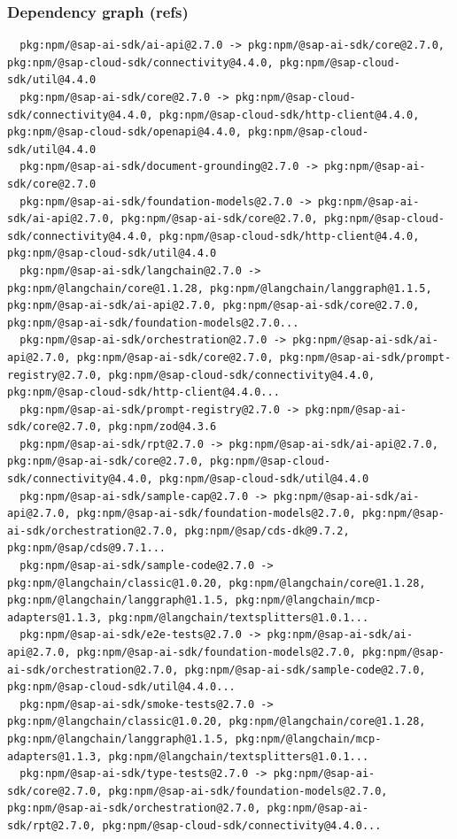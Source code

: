 \documentclass[11pt]{article}
\begin{document}
\subsubsection*{Dependency graph (refs)}
\begin{verbatim}
  pkg:npm/@sap-ai-sdk/ai-api@2.7.0 -> pkg:npm/@sap-ai-sdk/core@2.7.0, pkg:npm/@sap-cloud-sdk/connectivity@4.4.0, pkg:npm/@sap-cloud-sdk/util@4.4.0
  pkg:npm/@sap-ai-sdk/core@2.7.0 -> pkg:npm/@sap-cloud-sdk/connectivity@4.4.0, pkg:npm/@sap-cloud-sdk/http-client@4.4.0, pkg:npm/@sap-cloud-sdk/openapi@4.4.0, pkg:npm/@sap-cloud-sdk/util@4.4.0
  pkg:npm/@sap-ai-sdk/document-grounding@2.7.0 -> pkg:npm/@sap-ai-sdk/core@2.7.0
  pkg:npm/@sap-ai-sdk/foundation-models@2.7.0 -> pkg:npm/@sap-ai-sdk/ai-api@2.7.0, pkg:npm/@sap-ai-sdk/core@2.7.0, pkg:npm/@sap-cloud-sdk/connectivity@4.4.0, pkg:npm/@sap-cloud-sdk/http-client@4.4.0, pkg:npm/@sap-cloud-sdk/util@4.4.0
  pkg:npm/@sap-ai-sdk/langchain@2.7.0 -> pkg:npm/@langchain/core@1.1.28, pkg:npm/@langchain/langgraph@1.1.5, pkg:npm/@sap-ai-sdk/ai-api@2.7.0, pkg:npm/@sap-ai-sdk/core@2.7.0, pkg:npm/@sap-ai-sdk/foundation-models@2.7.0...
  pkg:npm/@sap-ai-sdk/orchestration@2.7.0 -> pkg:npm/@sap-ai-sdk/ai-api@2.7.0, pkg:npm/@sap-ai-sdk/core@2.7.0, pkg:npm/@sap-ai-sdk/prompt-registry@2.7.0, pkg:npm/@sap-cloud-sdk/connectivity@4.4.0, pkg:npm/@sap-cloud-sdk/http-client@4.4.0...
  pkg:npm/@sap-ai-sdk/prompt-registry@2.7.0 -> pkg:npm/@sap-ai-sdk/core@2.7.0, pkg:npm/zod@4.3.6
  pkg:npm/@sap-ai-sdk/rpt@2.7.0 -> pkg:npm/@sap-ai-sdk/ai-api@2.7.0, pkg:npm/@sap-ai-sdk/core@2.7.0, pkg:npm/@sap-cloud-sdk/connectivity@4.4.0, pkg:npm/@sap-cloud-sdk/util@4.4.0
  pkg:npm/@sap-ai-sdk/sample-cap@2.7.0 -> pkg:npm/@sap-ai-sdk/ai-api@2.7.0, pkg:npm/@sap-ai-sdk/foundation-models@2.7.0, pkg:npm/@sap-ai-sdk/orchestration@2.7.0, pkg:npm/@sap/cds-dk@9.7.2, pkg:npm/@sap/cds@9.7.1...
  pkg:npm/@sap-ai-sdk/sample-code@2.7.0 -> pkg:npm/@langchain/classic@1.0.20, pkg:npm/@langchain/core@1.1.28, pkg:npm/@langchain/langgraph@1.1.5, pkg:npm/@langchain/mcp-adapters@1.1.3, pkg:npm/@langchain/textsplitters@1.0.1...
  pkg:npm/@sap-ai-sdk/e2e-tests@2.7.0 -> pkg:npm/@sap-ai-sdk/ai-api@2.7.0, pkg:npm/@sap-ai-sdk/foundation-models@2.7.0, pkg:npm/@sap-ai-sdk/orchestration@2.7.0, pkg:npm/@sap-ai-sdk/sample-code@2.7.0, pkg:npm/@sap-cloud-sdk/util@4.4.0...
  pkg:npm/@sap-ai-sdk/smoke-tests@2.7.0 -> pkg:npm/@langchain/classic@1.0.20, pkg:npm/@langchain/core@1.1.28, pkg:npm/@langchain/langgraph@1.1.5, pkg:npm/@langchain/mcp-adapters@1.1.3, pkg:npm/@langchain/textsplitters@1.0.1...
  pkg:npm/@sap-ai-sdk/type-tests@2.7.0 -> pkg:npm/@sap-ai-sdk/core@2.7.0, pkg:npm/@sap-ai-sdk/foundation-models@2.7.0, pkg:npm/@sap-ai-sdk/orchestration@2.7.0, pkg:npm/@sap-ai-sdk/rpt@2.7.0, pkg:npm/@sap-cloud-sdk/connectivity@4.4.0...

\end{verbatim}
\end{document}
